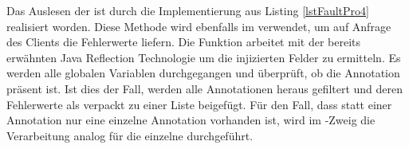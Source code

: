 \begin{figure}[!htb]
	
\end{figure}
Das Auslesen der  ist durch die Implementierung aus Listing \ref{lstFaultPro4} realisiert worden. Diese Methode wird ebenfalls im  verwendet, um  auf Anfrage des Clients die Fehlerwerte liefern. Die Funktion arbeitet mit der bereits erw\"ahnten Java Reflection Technologie um die injizierten Felder zu ermitteln. Es werden alle globalen Variablen durchgegangen und \"uberpr\"uft, ob die  Annotation präsent ist. Ist dies der Fall, werden alle  Annotationen heraus gefiltert und deren Fehlerwerte als  verpackt zu einer Liste beigef\"ugt. F\"ur den Fall, dass statt einer  Annotation nur eine einzelne  Annotation vorhanden ist, wird im -Zweig die Verarbeitung analog f\"ur die einzelne  durchgef\"uhrt.
\begin{figure}[!htb]
	
\end{figure}